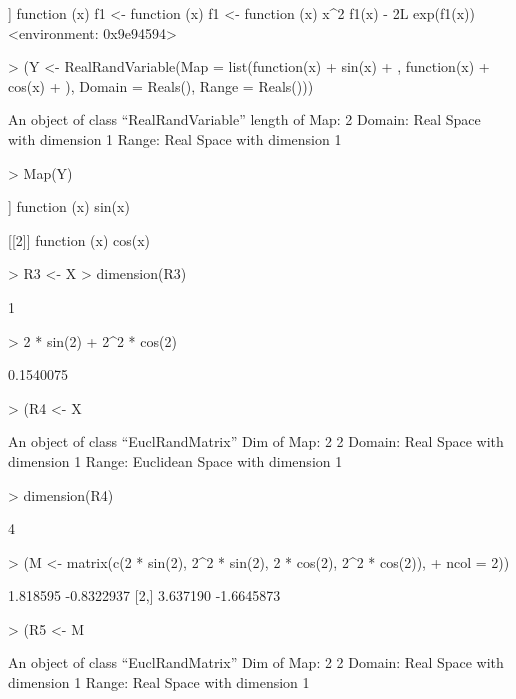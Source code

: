 \documentclass[11pt]{article}
\begin{document}
\begin{Schunk}
\begin{Soutput}
[[2]]
function (x) 
{
    f1 <- function (x) 
    {
        f1 <- function (x) 
        {
            x^2
        }
        f1(x) - 2L
    }
    exp(f1(x))
}
<environment: 0x9e94594>
\end{Soutput}
\begin{Sinput}
> (Y <- RealRandVariable(Map = list(function(x) {
+     sin(x)
+ }, function(x) {
+     cos(x)
+ }), Domain = Reals(), Range = Reals()))
\end{Sinput}
\begin{Soutput}
An object of class “RealRandVariable” 
length of Map:	 2 
Domain:	Real Space with dimension 1 
Range:	Real Space with dimension 1 
\end{Soutput}
\begin{Sinput}
> Map(Y)
\end{Sinput}
\begin{Soutput}
[[1]]
function (x) 
{
    sin(x)
}

[[2]]
function (x) 
{
    cos(x)
}
\end{Soutput}
\begin{Sinput}
> R3 <- X %
> dimension(R3)
\end{Sinput}
\begin{Soutput}
[1] 1
\end{Soutput}
\begin{Sinput}
> 2 * sin(2) + 2^2 * cos(2)
\end{Sinput}
\begin{Soutput}
[1] 0.1540075
\end{Soutput}
\begin{Sinput}
> (R4 <- X %
\end{Sinput}
\begin{Soutput}
An object of class “EuclRandMatrix” 
Dim of Map:	 2 2 
Domain:	Real Space with dimension 1 
Range:	Euclidean Space with dimension 1 
\end{Soutput}
\begin{Sinput}
> dimension(R4)
\end{Sinput}
\begin{Soutput}
[1] 4
\end{Soutput}
\begin{Sinput}
> (M <- matrix(c(2 * sin(2), 2^2 * sin(2), 2 * cos(2), 2^2 * cos(2)), 
+     ncol = 2))
\end{Sinput}
\begin{Soutput}
         [,1]       [,2]
[1,] 1.818595 -0.8322937
[2,] 3.637190 -1.6645873
\end{Soutput}
\begin{Sinput}
> (R5 <- M %
\end{Sinput}
\begin{Soutput}
An object of class “EuclRandMatrix” 
Dim of Map:	 2 2 
Domain:	Real Space with dimension 1 
Range:	Real Space with dimension 1 
\end{Soutput}
\end{Schunk}
\end{document}
